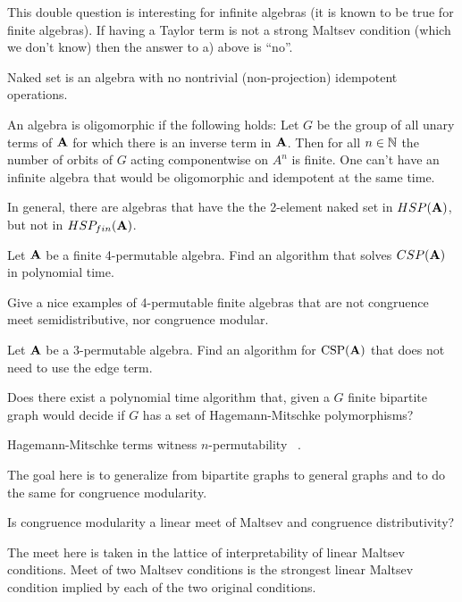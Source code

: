 \begin{context}
This double question is interesting for infinite algebras (it is known to be true for
finite algebras). If having a Taylor term is not a strong Maltsev condition
(which we don't know) then the answer to a) above is ``no''.

Naked set is an algebra with no nontrivial (non-projection) idempotent
operations.

An algebra is oligomorphic if the following holds: Let $G$ be the group of all
unary terms of ${\mathbf{A}}$ for which there is an inverse term in ${\mathbf{A}}$. Then for
all $n\in\mathbb{N}$ the number of orbits of $G$ acting componentwise on $A^n$ is
finite. One can't have an infinite algebra that would be
oligomorphic and idempotent at the same time.

In general, there are algebras that have the the 2-element naked set in
 $HSP({\mathbf{A}})$, but not in $HSP_{fin}({\mathbf{A}})$.
\end{context}
\begin{question}
  Let ${\mathbf{A}}$ be a finite 4-permutable algebra. Find an algorithm that solves
$CSP({\mathbf{A}})$ in polynomial time.
\end{question}
\begin{question}
 Give a nice examples of 4-permutable finite algebras that are not congruence meet
semidistributive, nor congruence modular.
\end{question}
\begin{question}
  Let ${\mathbf{A}}$ be a 3-permutable algebra. Find an algorithm for $\operatorname{CSP}({\mathbf{A}})$
that does not need to use the edge term.
\end{question}
\begin{question}
  Does there exist a polynomial time algorithm that, given a $G$ finite
bipartite graph would decide if $G$ has a set of Hagemann-Mitschke
polymorphisms?
\end{question}
\begin{context}
  Hagemann-Mitschke terms witness $n$-permutability ~\cite{hagemann-mitschke}.

  The goal here is to generalize from bipartite graphs to general graphs and
to do the same for congruence modularity.
\end{context}

\begin{question}
  Is congruence modularity a linear meet of Maltsev and congruence
distributivity?
\end{question}
\begin{context}
The meet here is taken in the lattice of interpretability of linear Maltsev
conditions. Meet of two Maltsev conditions is the strongest linear Maltsev
condition implied by each of the two original conditions.
\end{context}

